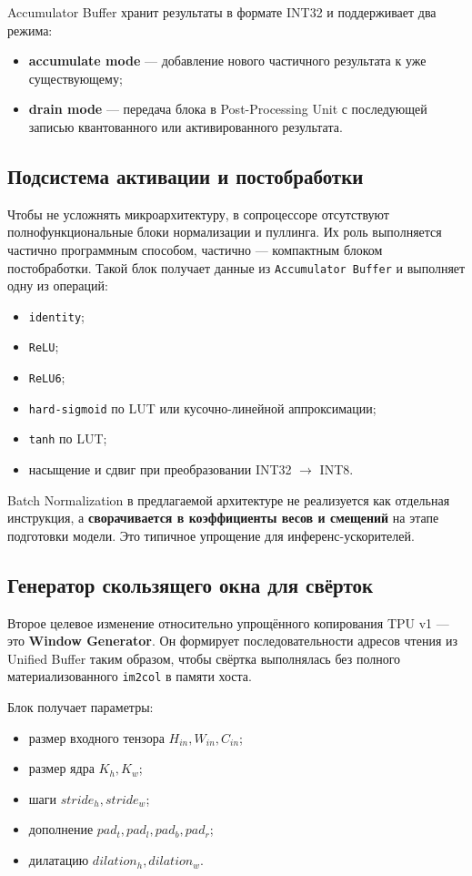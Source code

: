 \documentclass[12pt,a4paper]{article}
\begin{document}
Accumulator Buffer хранит результаты в формате INT32 и поддерживает два режима:
\begin{itemize}
    \item \textbf{accumulate mode} --- добавление нового частичного результата к уже существующему;
    \item \textbf{drain mode} --- передача блока в Post-Processing Unit с последующей записью квантованного или активированного результата.
\end{itemize}

\subsection{Подсистема активации и постобработки}

Чтобы не усложнять микроархитектуру, в сопроцессоре отсутствуют полнофункциональные блоки нормализации и пуллинга. Их роль выполняется частично программным способом, частично --- компактным блоком постобработки. Такой блок получает данные из \texttt{Accumulator Buffer} и выполняет одну из операций:
\begin{itemize}
    \item \texttt{identity};
    \item \texttt{ReLU};
    \item \texttt{ReLU6};
    \item \texttt{hard-sigmoid} по LUT или кусочно-линейной аппроксимации;
    \item \texttt{tanh} по LUT;
    \item насыщение и сдвиг при преобразовании INT32 \(\rightarrow\) INT8.
\end{itemize}

Batch Normalization в предлагаемой архитектуре не реализуется как отдельная инструкция, а \textbf{сворачивается в коэффициенты весов и смещений} на этапе подготовки модели. Это типичное упрощение для инференс-ускорителей.

\subsection{Генератор скользящего окна для свёрток}

Второе целевое изменение относительно упрощённого копирования TPU v1 --- это \textbf{Window Generator}. Он формирует последовательности адресов чтения из Unified Buffer таким образом, чтобы свёртка выполнялась без полного материализованного \texttt{im2col} в памяти хоста.

Блок получает параметры:
\begin{itemize}
    \item размер входного тензора \(H_{in}, W_{in}, C_{in}\);
    \item размер ядра \(K_h, K_w\);
    \item шаги \(stride_h, stride_w\);
    \item дополнение \(pad_t, pad_l, pad_b, pad_r\);
    \item дилатацию \(dilation_h, dilation_w\).
\end{itemize}
\end{document}

